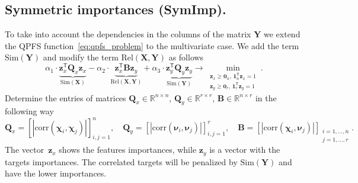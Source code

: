 \documentclass[12pt,twoside]{article}
\theoremstyle{definition}
\newcommand{\bz}{\mathbf{z}}
\newcommand{\bY}{\mathbf{Y}}
\newcommand{\bX}{\mathbf{X}}
\newcommand{\bB}{\mathbf{B}}
\newcommand{\bQ}{\mathbf{Q}}
\newcommand{\bbR}{\mathbb{R}}
\newcommand{\T}{\mathsf{T}}
\newcommand{\bchi}{\boldsymbol{\chi}}
\newcommand{\bnu}{\boldsymbol{\nu}}
\newcommand{\bOne}{\boldsymbol{1}}
\newcommand{\bZero}{\boldsymbol{0}}
\begin{document}
\subsection{Symmetric importances (SymImp).}

To take into account the dependencies in the columns of the matrix $\bY$ we extend the QPFS function~\eqref{eq:qpfs_problem} to the multivariate case.
We add the term~$\text{Sim}(\bY)$ and modify the term $\text{Rel}(\bX, \bY)$ as follows
\begin{equation}
\alpha_1 \cdot \underbrace{\bz_x^{\T} \bQ_x \bz_x}_{\text{Sim}(\bX)} - \alpha_2 \cdot \underbrace{\bz_x^{\T} \bB \bz_y}_{\text{Rel}(\bX, \bY)} + \alpha_3 \cdot \underbrace{\bz_y^{\T} \bQ_y \bz_y}_{\text{Sim}(\bY)} \rightarrow \min_{\substack{\bz_x \geq \bZero_n, \, \bOne_n^{\T}\bz_x=1 \\ \bz_y \geq \bZero_r, \, \bOne_r^{\T}\bz_y=1}}.
\label{eq:symimp}
\end{equation}
Determine the entries of matrices $\bQ_x \in \bbR^{n \times n}$, $\bQ_y \in \bbR^{r \times r}$, $\bB \in \bbR^{n \times r}$ in the following way
\begin{equation*}
\bQ_x = \left[ |\text{corr}(\bchi_i, \bchi_j)| \right]_{i,j=1}^n, \quad
\bQ_y = \left[ |\text{corr}(\bnu_i, \bnu_j)| \right]_{i,j=1}^r, \quad
\bB =  \left[ |\text{corr}(\bchi_i, \bnu_j)| \right]_{\substack{i=1, \dots, n \\ j=1, \dots, r}}.
\end{equation*}
The vector~$\bz_x$ shows the features importances, while $\bz_y$ is a vector with the targets importances.
The correlated targets will be penalized by $\text{Sim} (\bY)$ and have the lower importances.
\end{document}

